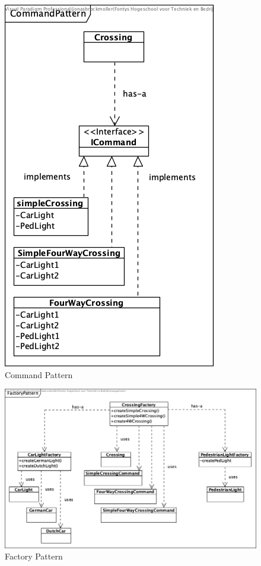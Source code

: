\documentclass{report}
\begin{document}
\begin{figure}[H]
\begin{minipage}[b]{0.4\textwidth}
            \includegraphics[scale=0.91]{pictures/CommandPattern.png}
            \caption{Command Pattern}
            \label{fig:commandPattern}
        \end{minipage}
    \end{figure}
    \begin{figure}[H]
        \centering
        \includegraphics[scale=0.9]{pictures/FactoryPattern.png}
        \caption{Factory Pattern}
        \label{fig:factoryPattern}
    \end{figure}
\end{document}
